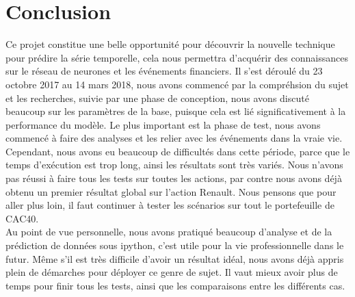 
\section{Conclusion}

Ce projet constitue une belle opportunité pour découvrir la nouvelle technique pour prédire la série temporelle, cela nous permettra d’acquérir des connaissances sur le réseau de neurones et les événements financiers. Il s’est déroulé du 23 octobre 2017 au 14 mars 2018, nous avons commencé par la compréhsion du sujet et les recherches, suivie par une phase de conception, nous avons discuté beaucoup sur les paramètres de la base, puisque cela est lié significativement à la performance du modèle. Le plus important est la phase de test, nous avons commencé à faire des analyses et les relier avec les événements dans la vraie vie. Cependant, nous avons eu beaucoup de difficultés dans cette période, parce que le temps d'exécution est trop long, ainsi les résultats sont très variés. Nous n'avons pas réussi à faire tous les tests sur toutes les actions, par contre nous avons déjà obtenu un premier résultat global sur l'action Renault. Nous pensons que pour aller plus loin, il faut continuer à tester les scénarios sur tout le portefeuille de CAC40. \\

Au point de vue personnelle, nous avons pratiqué beaucoup d'analyse et de la prédiction de données sous ipython, c'est utile pour la vie professionnelle dans le futur. Même s'il est très difficile d'avoir un résultat idéal, nous avons déjà appris plein de démarches pour déployer ce genre de sujet. Il vaut mieux avoir plus de temps pour finir tous les tests, ainsi que les comparaisons entre les différents cas. 